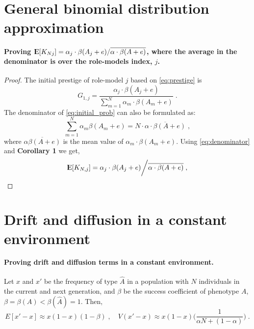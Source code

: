 \documentclass[12pt]{extarticle}
\DeclareMathOperator*{\E}{{\rm I\kern-.3em E}}
\begin{document}
\begin{appendices}
\renewcommand{\theequation}{\thesection\arabic{equation}}

\section{General binomial distribution approximation} \label{sec:GBD}

\paragraph{Proving $\E[K_{Nj}] = \alpha_j \cdot \beta(A_j+e) / \overline{\alpha \cdot \beta(A+e)}$, where the {average} in the denominator is over the role-models index, $j$.}


\begin{proof}
The initial prestige of role-model $j$ based on \cref{eq:prestige} is
\begin{equation}\label{eq:initial_prob}
G_{1,j} = \frac{\alpha_j\cdot\beta(A_j+e)}{\sum\limits_{m=1}^{N} \alpha_m\cdot\beta(A_m+e)} \;.
\end{equation}
The denominator of \cref{eq:initial_prob} can also be formulated as:
\begin{equation}\label{eq:denominator}
 \sum\limits_{m=1}^{N}\alpha_m\beta(A_m+e) = N \cdot \overline{\alpha \cdot \beta(A+e)} \;,
\end{equation}
where $\overline{\alpha\beta(A+e)}$ is the mean value of $\alpha_m\cdot\beta(A_m+e)$.
Using \cref{eq:denominator} and \textbf{Corollary 1} we get,
\begin{equation}
\E[K_{N,j}] = \alpha_j \cdot \beta(A_j+e) \bigg/ \overline{\alpha \cdot \beta(A+e)} \;,
\end{equation}
\end{proof}

\section{Drift and diffusion in a constant environment} \label{sec:drift_diff_const}

\paragraph{Proving drift and diffusion terms in a constant environment.}
Let $x$ and $x'$ be the frequency of type $\hat{A}$ in a population with $N$ individuals in the current and next generation, and  $\beta$ {be} the success coefficient of phenotype $A$, $\beta = \beta(A) < \beta(\hat{A}) = 1$.
Then,
\begin{equation*}
E[x'-x] \approx x(1-x)(1-\beta) \;, 
\quad
V(x'-x) \approx x(1-x)\Big(\frac{1}{\alpha N + (1-\alpha)}\Big) \;.
\end{equation*} 



\end{appendices}
\end{document}
